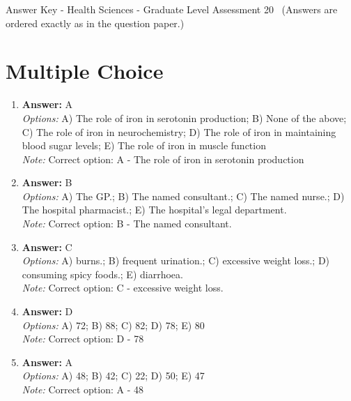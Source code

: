 \documentclass[12pt]{article}
\begin{document}
\begin{center}
Answer Key - Health Sciences - Graduate Level Assessment 20 \
\small (Answers are ordered exactly as in the question paper.)
\end{center}

\section*{Multiple Choice}
\begin{enumerate}[label=\arabic*.]
\item \textbf{Answer:} A
\\ \textit{Options:} A) The role of iron in serotonin production; B) None of the above; C) The role of iron in neurochemistry; D) The role of iron in maintaining blood sugar levels; E) The role of iron in muscle function
\\ \textit{Note:} Correct option: A - The role of iron in serotonin production
\item \textbf{Answer:} B
\\ \textit{Options:} A) The GP.; B) The named consultant.; C) The named nurse.; D) The hospital pharmacist.; E) The hospital's legal department.
\\ \textit{Note:} Correct option: B - The named consultant.
\item \textbf{Answer:} C
\\ \textit{Options:} A) burns.; B) frequent urination.; C) excessive weight loss.; D) consuming spicy foods.; E) diarrhoea.
\\ \textit{Note:} Correct option: C - excessive weight loss.
\item \textbf{Answer:} D
\\ \textit{Options:} A) 72; B) 88; C) 82; D) 78; E) 80
\\ \textit{Note:} Correct option: D - 78
\item \textbf{Answer:} A
\\ \textit{Options:} A) 48; B) 42; C) 22; D) 50; E) 47
\\ \textit{Note:} Correct option: A - 48
\end{enumerate}
\end{document}
